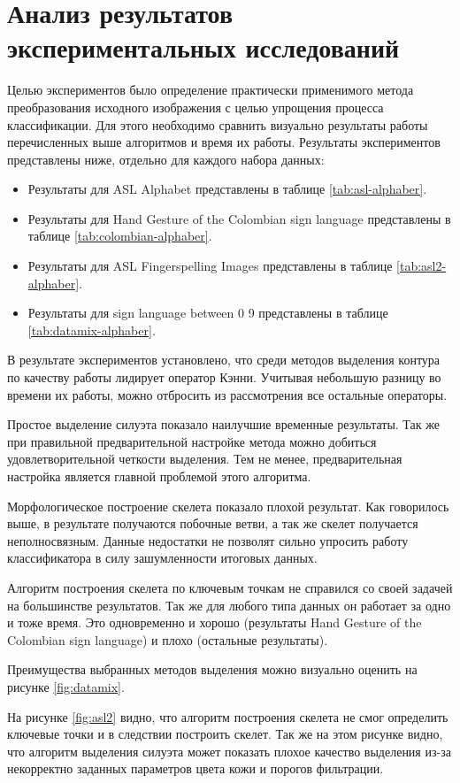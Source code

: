 \section{Анализ результатов экспериментальных исследований}
\label{sec:Results}

Целью экспериментов было определение практически применимого метода преобразования исходного изображения с целью упрощения процесса классификации. Для этого необходимо сравнить визуально результаты работы перечисленных выше алгоритмов и время их работы. Результаты экспериментов представлены ниже, отдельно для каждого набора данных:

\begin{itemize}
	\item Результаты для ASL Alphabet представлены  в таблице \ref{tab:asl-alphaber}.
	\item Результаты для Hand Gesture of the Colombian sign language представлены в таблице \ref{tab:colombian-alphaber}.
	\item Результаты для ASL Fingerspelling Images представлены в таблице \ref{tab:asl2-alphaber}.
	\item Результаты для sign language between 0 9 представлены  в таблице \ref{tab:datamix-alphaber}.
\end{itemize}

В результате экспериментов установлено, что среди методов выделения контура по качеству работы лидирует оператор Кэнни. Учитывая небольшую разницу во времени их работы, можно отбросить из рассмотрения все остальные операторы.

Простое выделение силуэта показало наилучшие временные результаты. Так же при правильной предварительной настройке метода можно добиться удовлетворительной четкости выделения. Тем не менее, предварительная настройка является главной проблемой этого алгоритма.

Морфологическое построение скелета показало плохой результат. Как говорилось выше, в результате получаются побочные ветви, а так же скелет получается неполносвязным. Данные недостатки не позволят сильно упросить работу классификатора в силу зашумленности итоговых данных.

Алгоритм построения скелета по ключевым точкам не справился со своей задачей на большинстве результатов. Так же для любого типа данных он работает за одно и тоже время. Это одновременно и хорошо (результаты Hand Gesture of the Colombian sign language) и плохо (остальные результаты).

Преимущества выбранных методов выделения можно визуально оценить на рисунке \ref{fig:datamix}.

На рисунке \ref{fig:asl2} видно, что алгоритм построения скелета не смог определить ключевые точки и в следствии построить скелет. Так же на этом рисунке видно, что алгоритм выделения силуэта может показать плохое качество выделения из-за некорректно заданных параметров цвета кожи и порогов фильтрации.
